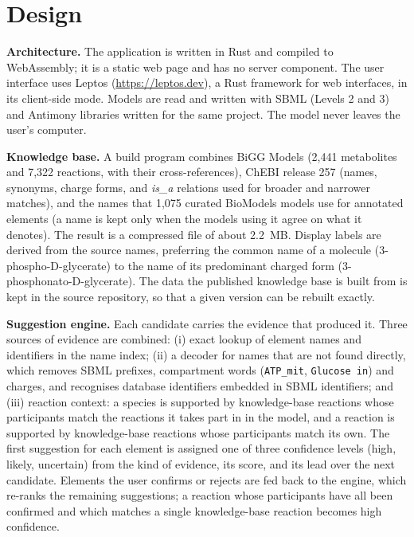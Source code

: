 \documentclass[10pt]{article}
\begin{document}
\section{Design}
\textbf{Architecture.} The application is written in Rust and compiled to WebAssembly; it is a static web page
and has no server component. The user interface uses Leptos (\url{https://leptos.dev}), a Rust framework
for web interfaces, in its client-side mode. Models are read and written with SBML (Levels 2 and 3) and Antimony
\cite{smith2009antimony} libraries written for the same project. The model never leaves the user's computer.

\textbf{Knowledge base.} A build program combines BiGG Models \cite{king2016bigg} (2,441 metabolites and
7,322 reactions, with their cross-references), ChEBI \cite{hastings2016chebi} release 257 (names, synonyms,
charge forms, and \emph{is\_a} relations used for broader and narrower matches), and the names that 1,075
curated BioModels models \cite{malik2020biomodels} use for annotated elements (a name is kept only when the
models using it agree on what it denotes). The result is a compressed file of about 2.2~MB. Display labels
are derived from the source names, preferring the common name of a molecule (3-phospho-D-glycerate) to the
name of its predominant charged form (3-phosphonato-D-glycerate). The data the published knowledge base is
built from is kept in the source repository, so that a given version can be rebuilt exactly.

\textbf{Suggestion engine.} Each candidate carries the evidence that produced it. Three sources of evidence
are combined: (i) exact lookup of element names and identifiers in the name index; (ii) a decoder for
names that are not found directly, which removes SBML prefixes, compartment words (\texttt{ATP\_mit},
\texttt{Glucose in}) and charges, and recognises database identifiers embedded in SBML identifiers; and
(iii) reaction context: a species is supported by knowledge-base reactions whose participants match the
reactions it takes part in in the model, and a reaction is supported by knowledge-base reactions whose
participants match its own. The first suggestion for each element is assigned one of three confidence
levels (high, likely, uncertain) from the kind of evidence, its score, and its lead over the next
candidate. Elements the user confirms or rejects
are fed back to the engine, which re-ranks the remaining suggestions; a reaction whose participants have all
been confirmed and which matches a single knowledge-base reaction becomes high confidence.
\end{document}
